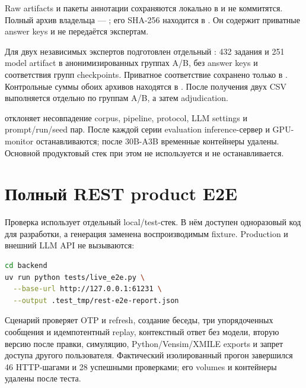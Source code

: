 Raw artifacts и пакеты аннотации сохраняются локально в  и не коммитятся. Полный архив владельца --- ; его SHA-256 находится в . Он содержит приватные answer keys и не передаётся экспертам.

Для двух независимых экспертов подготовлен отдельный : 432 задания и 251 model artifact в анонимизированных группах A/B, без answer keys и соответствия групп checkpoints. Приватное соответствие сохранено только в . Контрольные суммы обоих архивов находятся в . После получения двух CSV выполняется  отдельно по группам A/B, а затем adjudication.

 отклоняет несовпадение corpus, pipeline, protocol, LLM settings и prompt/run/seed пар. После каждой серии evaluation inference-сервер и GPU-monitor останавливаются; после 30B-A3B временные контейнеры удалены. Основной продуктовый стек при этом не используется и не останавливается.

\section{Полный REST product E2E}

Проверка использует отдельный local/test-стек. В нём доступен одноразовый код для разработки, а генерация заменена воспроизводимым fixture. Production и внешний LLM API не вызываются:

\begin{lstlisting}[language=bash]
cd backend
uv run python tests/live_e2e.py \
  --base-url http://127.0.0.1:61231 \
  --output .test_tmp/rest-e2e-report.json
\end{lstlisting}

Сценарий проверяет OTP и refresh, создание беседы, три упорядоченных сообщения и идемпотентный replay, контекстный ответ без модели, вторую версию после правки, симуляцию, Python/Vensim/XMILE exports и запрет доступа другого пользователя. Фактический изолированный прогон завершился 46 HTTP-шагами и 28 успешными проверками; его volumes и контейнеры удалены после теста.
